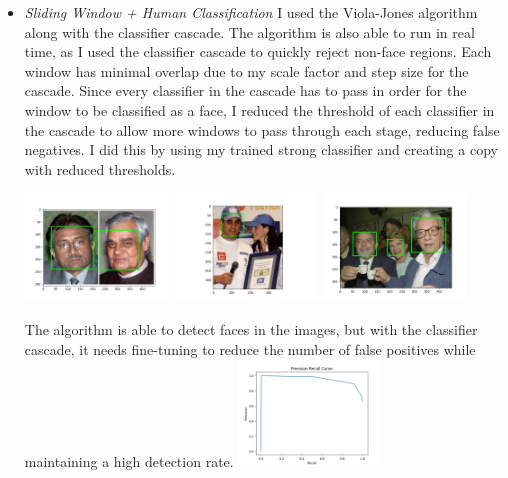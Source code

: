 \documentclass[11pt]{article}
\begin{document}
\begin{itemize}
        \item \textit{Sliding Window + Human Classification}\newline
        I used the Viola-Jones algorithm along with the classifier cascade. The algorithm is also
        able to run in real time, as I used the classifier cascade to quickly reject non-face
        regions. Each window has minimal overlap due to my scale factor and step size for the
        cascade. Since every classifier in the cascade has to pass in order for the window to be
        classified as a face, I reduced the threshold of each classifier in the cascade to allow
        more windows to pass through each stage, reducing false negatives. I did this by using my
        trained strong classifier and creating a copy with reduced thresholds.\newline
        \begin{center}
            \includegraphics[width=0.3\textwidth]{Output Pictures/ex_1}
            \includegraphics[width=0.3\textwidth]{Output Pictures/ex_2}
            \includegraphics[width=0.3\textwidth]{Output Pictures/ex_3}
        \end{center}
        The algorithm is able to detect faces in the images, but with the classifier cascade, it
        needs fine-tuning to reduce the number of false positives while maintaining a high detection
        rate.\newline
        \includegraphics[width=0.3\textwidth]{Output Pictures/prc}

    \end{itemize}
\end{document}
